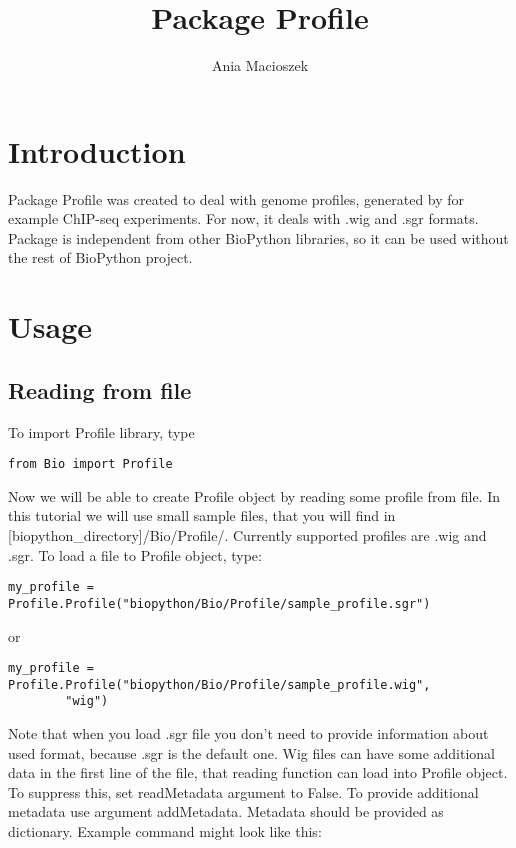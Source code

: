 \documentclass[a4paper,11pt,portrait]{article}
\title{Package Profile}
\author{Ania Macioszek}
\date{}
\begin{document}
\maketitle

\section{Introduction}

Package Profile was created to deal with genome profiles,
generated by for example ChIP-seq experiments.
For now, it deals with .wig and .sgr formats.
Package is independent from other BioPython libraries,
so it can be used without the rest of BioPython project.


\section{Usage}

\subsection{Reading from file}

To import Profile library, type

\begin{verbatim}
from Bio import Profile
\end{verbatim}

Now we will be able to create Profile object
by reading some profile from file.
In this tutorial we will use small sample files,
that you will find in [biopython\_directory]/Bio/Profile/.
Currently supported profiles are .wig and .sgr.
To load a file to Profile object, type:

\begin{verbatim}
my_profile = Profile.Profile("biopython/Bio/Profile/sample_profile.sgr")
\end{verbatim}

or

\begin{verbatim}
my_profile = Profile.Profile("biopython/Bio/Profile/sample_profile.wig",
		"wig")
\end{verbatim}

Note that when you load .sgr file you don't need to provide information about used format,
because .sgr is the default one.
Wig files can have some additional data in the first line of the file,
that reading function can load into Profile object.
To suppress this, set readMetadata argument to False.
To provide additional metadata use argument addMetadata.
Metadata should be provided as dictionary.
Example command might look like this:
\end{document}
